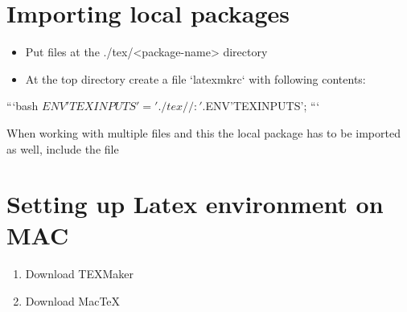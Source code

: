 \documentclass[class=article, crop=false]{standalone}
\begin{document}
\section{Importing local packages}
\begin{itemize}
    \item Put files at the ./tex/<package-name> directory
    \item At the top directory create a file `latexmkrc` with following contents:
\end{itemize}

\begin{markdown}
```bash
$ENV{'TEXINPUTS'}='./tex//:' . $ENV{'TEXINPUTS'}; 
```    
\end{markdown}


When working with multiple files and this the local package has to be imported as well, include the file

\section{Setting up Latex environment on MAC}

\begin{enumerate}
    \item Download TEXMaker
    \item Download MacTeX
\end{enumerate}
\end{document}
